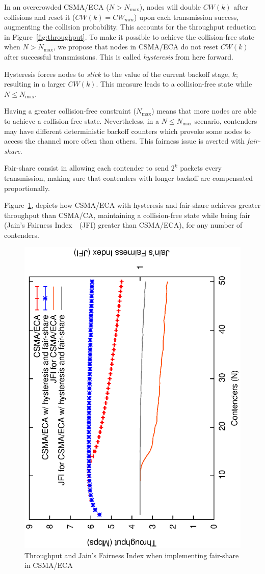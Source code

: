 In an overcrowded CSMA/ECA ($N>N_{\max}$), nodes will double $CW(k)$ after collisions and reset it ($CW(k)=CW_{min}$) upon each transmission success, augmenting the collision probability. This accounts for the throughput reduction in Figure~\ref{fig:throughput}. To make it possible to achieve the collision-free state when $N>N_{\max}$, we propose that nodes in CSMA/ECA do not reset $CW(k)$ after successful transmissions. This is called \emph{hysteresis} from here forward.

Hysteresis forces nodes to \emph{stick} to the value of the current backoff stage, $k$; resulting in a larger $CW(k)$. This measure leads to a collision-free state while $N\leq N_{\max}$.

Having a greater collision-free constraint ($N_{\max}$) means that more nodes are able to achieve a collision-free state. Nevertheless, in a $N\leq N_{\max}$ scenario, contenders may have different deterministic backoff counters which provoke some nodes to access the channel more often than others. This fairness issue is averted with \emph{fair-share}.

Fair-share consist in allowing each contender to send $2^{k}$ packets every transmission, making sure that contenders with longer backoff are compensated proportionally.

Figure~\ref{fig:fairShare}, depicts how CSMA/ECA with hysteresis and fair-share achieves greater throughput than CSMA/CA, maintaining a collision-free state while being fair (Jain's Fairness Index~\cite{JFI}~(JFI) greater than CSMA/ECA), for any number of contenders.

\begin{figure}[htbp]
  \centering
  \includegraphics[width=0.7\linewidth, angle = -90]{figures/errorPlots/ECA-w-enhancements-fixed.eps}
  \caption{Throughput and Jain's Fairness Index when implementing fair-share in CSMA/ECA
  \label{fig:fairShare}}
\end{figure}

